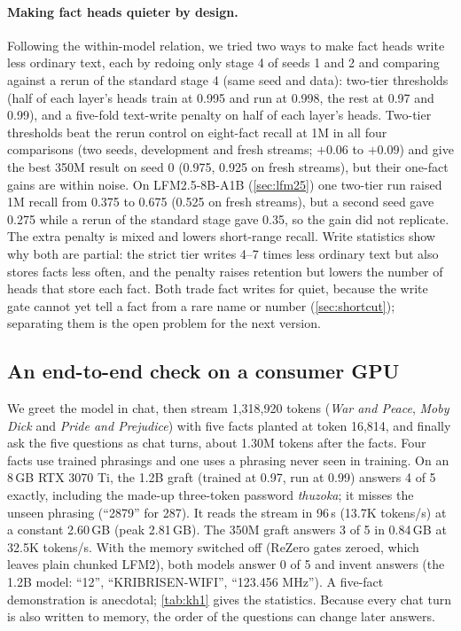 \documentclass[11pt]{article}
\begin{document}
\paragraph{Making fact heads quieter by design.} Following the within-model relation, we tried two ways to make fact heads write less ordinary text, each by redoing only stage 4 of seeds 1 and 2 and comparing against a rerun of the standard stage 4 (same seed and data): two-tier thresholds (half of each layer's heads train at 0.995 and run at 0.998, the rest at 0.97 and 0.99), and a five-fold text-write penalty on half of each layer's heads. Two-tier thresholds beat the rerun control on eight-fact recall at 1M in all four comparisons (two seeds, development and fresh streams; $+0.06$ to $+0.09$) and give the best 350M result on seed 0 (0.975, 0.925 on fresh streams), but their one-fact gains are within noise. On LFM2.5-8B-A1B (\cref{sec:lfm25}) one two-tier run raised 1M recall from 0.375 to 0.675 (0.525 on fresh streams), but a second seed gave 0.275 while a rerun of the standard stage gave 0.35, so the gain did not replicate. The extra penalty is mixed and lowers short-range recall. Write statistics show why both are partial: the strict tier writes 4--7 times less ordinary text but also stores facts less often, and the penalty raises retention but lowers the number of heads that store each fact. Both trade fact writes for quiet, because the write gate cannot yet tell a fact from a rare name or number (\cref{sec:shortcut}); separating them is the open problem for the next version.

\subsection{An end-to-end check on a consumer GPU}
\label{sec:demo}
We greet the model in chat, then stream 1{,}318{,}920 tokens (\emph{War and Peace}, \emph{Moby Dick} and \emph{Pride and Prejudice}) with five facts planted at token 16{,}814, and finally ask the five questions as chat turns, about 1.30M tokens after the facts. Four facts use trained phrasings and one uses a phrasing never seen in training. On an 8\,GB RTX 3070 Ti, the 1.2B graft (trained at 0.97, run at 0.99) answers 4 of 5 exactly, including the made-up three-token password \emph{thuzoka}; it misses the unseen phrasing (``2879'' for 287). It reads the stream in 96\,s (13.7K tokens/s) at a constant 2.60\,GB (peak 2.81\,GB). The 350M graft answers 3 of 5 in 0.84\,GB at 32.5K tokens/s. With the memory switched off (ReZero gates zeroed, which leaves plain chunked LFM2), both models answer 0 of 5 and invent answers (the 1.2B model: ``12'', ``KRIBRISEN-WIFI'', ``123.456 MHz''). A five-fact demonstration is anecdotal; \cref{tab:kh1} gives the statistics. Because every chat turn is also written to memory, the order of the questions can change later answers.
\end{document}
